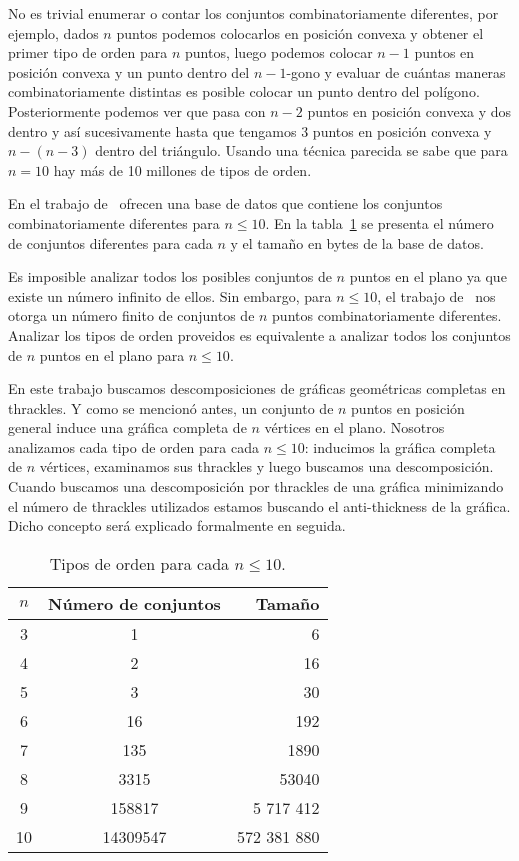 No es trivial enumerar o contar los conjuntos combinatoriamente diferentes, por ejemplo,
dados $n$ puntos podemos colocarlos en posición convexa y obtener el primer tipo de orden
para $n$ puntos, luego podemos colocar $n-1$ puntos en posición convexa y un punto dentro
del $n-1$-gono y evaluar de cuántas maneras combinatoriamente distintas es posible colocar
un punto dentro del polígono. Posteriormente podemos ver que pasa con $n-2$ puntos
en posición convexa y dos dentro y así sucesivamente hasta que tengamos 3 puntos en posición
convexa y $n-(n-3)$ dentro del triángulo. Usando una técnica parecida se sabe que para $n=10$
hay más de 10 millones de tipos de orden.

En el trabajo de~\cite{Aichholzer2002} ofrecen una base de datos que contiene los conjuntos
combinatoriamente diferentes para $n\leq 10$. En la tabla~\ref{tab:ots} se presenta el número
de conjuntos diferentes para cada $n$ y el tamaño en bytes de la base de datos.


Es imposible analizar todos los posibles conjuntos de $n$ puntos en el plano
ya que existe un número infinito de ellos. Sin embargo, para $n\leq 10$, el trabajo de~\cite{Aichholzer2002}
nos otorga un número finito de conjuntos de $n$ puntos combinatoriamente diferentes.
Analizar los tipos de orden proveidos es equivalente a analizar todos los conjuntos de $n$ puntos
en el plano para $n\leq 10$.

En este trabajo buscamos descomposiciones de gráficas geométricas completas en thrackles.
Y como se mencionó antes, un conjunto de $n$ puntos en posición general
induce una gráfica completa de $n$ vértices en el plano. Nosotros analizamos
cada tipo de orden para cada $n\leq 10$: inducimos la gráfica completa de $n$ vértices,
examinamos sus thrackles y luego buscamos una descomposición. Cuando buscamos
una descomposición por thrackles de una gráfica minimizando el número de thrackles utilizados
estamos buscando el anti-thickness de la gráfica. Dicho concepto será explicado
formalmente en seguida.
\begin{table}[ht]
  \centering
  \begin{tabular}{|c|c|r|}
  \hline
  $n$ & Número de conjuntos & Tamaño    \\ \hline
  3     & 1                   & 6       \\ \hline
  4     & 2                   & 16      \\ \hline
  5     & 3                   & 30      \\ \hline
  6     & 16                  & 192     \\ \hline
  7     & 135                 & 1890    \\ \hline
  8     & 3315                & 53040   \\ \hline
  9     & 158817              &	5 717 412   \\\hline
  10    & 14309547            & 572 381 880 \\ \hline
  \end{tabular}
  \caption{Tipos de orden para cada $n\leq10$.}
  \label{tab:ots}
\end{table}


